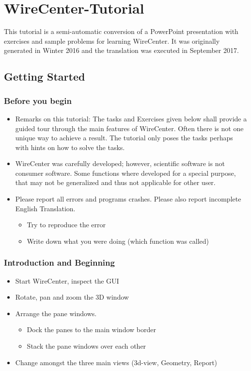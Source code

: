\chapter{WireCenter-Tutorial}

This tutorial is a semi-automatic conversion of a PowerPoint presentation with exercises and sample problems for learning WireCenter. It was originally generated in Winter 2016 and the translation was executed in September 2017.

\section{Getting Started}
\subsection{Before you begin}

\begin{itemize}
\item  {Remarks on this tutorial: The tasks and Exercises given
  below shall provide a guided tour through the main features of
  WireCenter. Often there is not one unique way to achieve a result. The
  tutorial only poses the tasks perhaps with hints on how to solve the
  tasks.}
\item  {WireCenter was carefully developed; however, scientific
  software is not consumer software. Some functions where developed for
  a special purpose, that may not be generalized and thus not applicable
  for other
  user.}
\item  {Please report all errors and programs crashes. Please
  also report incomplete English Translation.}
\begin{itemize}
\item  {Try to reproduce the
  error}
\item  {Write down what you were doing (which function was
  called)}
\end{itemize}
\end{itemize}

\subsection{Introduction and Beginning}

\begin{itemize}
\item  {Start WireCenter, inspect the GUI}
\item  {Rotate, pan and zoom the 3D window}
\item  {Arrange the pane windows.}
\begin{itemize}
\item  {Dock the panes to the main window border}
\item  {Stack the pane windows over each other}
\end{itemize}
\item  {Change amongst the three main views (3d-view, Geometry, Report)}
\end{itemize}


